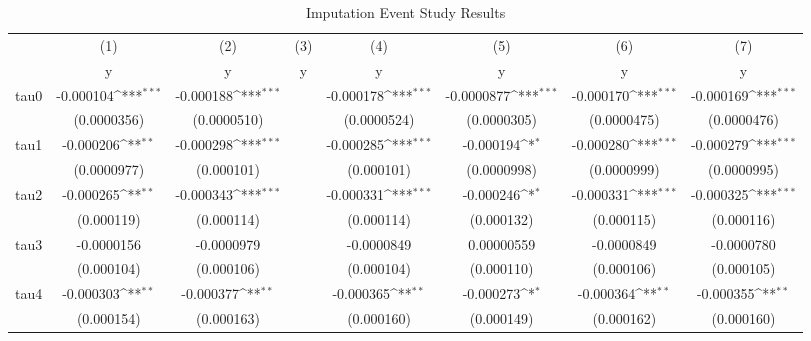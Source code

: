 \begin{table}[htbp]\centering
\def\sym#1{\ifmmode^{#1}\else\(^{#1}\)\fi}
\caption{Imputation Event Study Results}
\begin{tabular}{l*{7}{c}}
\hline\hline
            &\multicolumn{1}{c}{(1)}&\multicolumn{1}{c}{(2)}&\multicolumn{1}{c}{(3)}&\multicolumn{1}{c}{(4)}&\multicolumn{1}{c}{(5)}&\multicolumn{1}{c}{(6)}&\multicolumn{1}{c}{(7)}\\
            &\multicolumn{1}{c}{y}&\multicolumn{1}{c}{y}&\multicolumn{1}{c}{y}&\multicolumn{1}{c}{y}&\multicolumn{1}{c}{y}&\multicolumn{1}{c}{y}&\multicolumn{1}{c}{y}\\
\hline
tau0        &   -0.000104\sym{***}&   -0.000188\sym{***}&                     &   -0.000178\sym{***}&  -0.0000877\sym{***}&   -0.000170\sym{***}&   -0.000169\sym{***}\\
            & (0.0000356)         & (0.0000510)         &                     & (0.0000524)         & (0.0000305)         & (0.0000475)         & (0.0000476)         \\
[1em]
tau1        &   -0.000206\sym{**} &   -0.000298\sym{***}&                     &   -0.000285\sym{***}&   -0.000194\sym{*}  &   -0.000280\sym{***}&   -0.000279\sym{***}\\
            & (0.0000977)         &  (0.000101)         &                     &  (0.000101)         & (0.0000998)         & (0.0000999)         & (0.0000995)         \\
[1em]
tau2        &   -0.000265\sym{**} &   -0.000343\sym{***}&                     &   -0.000331\sym{***}&   -0.000246\sym{*}  &   -0.000331\sym{***}&   -0.000325\sym{***}\\
            &  (0.000119)         &  (0.000114)         &                     &  (0.000114)         &  (0.000132)         &  (0.000115)         &  (0.000116)         \\
[1em]
tau3        &  -0.0000156         &  -0.0000979         &                     &  -0.0000849         &  0.00000559         &  -0.0000849         &  -0.0000780         \\
            &  (0.000104)         &  (0.000106)         &                     &  (0.000104)         &  (0.000110)         &  (0.000106)         &  (0.000105)         \\
[1em]
tau4        &   -0.000303\sym{**} &   -0.000377\sym{**} &                     &   -0.000365\sym{**} &   -0.000273\sym{*}  &   -0.000364\sym{**} &   -0.000355\sym{**} \\
            &  (0.000154)         &  (0.000163)         &                     &  (0.000160)         &  (0.000149)         &  (0.000162)         &  (0.000160)         \\

\end{tabular}
\end{table}

